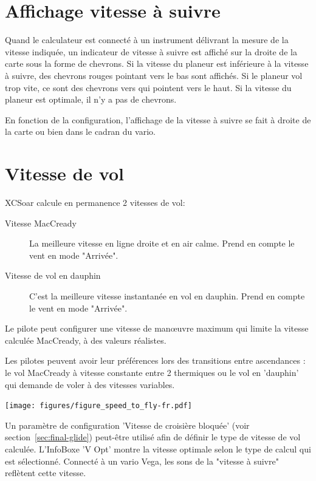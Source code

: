 \section{Affichage vitesse à suivre}

Quand le calculateur est connecté à un instrument délivrant la mesure de la vitesse indiquée, un indicateur de vitesse à suivre est affiché sur la droite de la carte sous la forme de chevrons. Si la vitesse du planeur est inférieure à la vitesse à suivre, des chevrons rouges pointant vers le bas sont affichés. Si le planeur vol trop vite, ce sont des chevrons vers qui pointent vers le haut. Si la vitesse du planeur est optimale, il n'y a pas de chevrons.

En fonction de la configuration, l'affichage de la vitesse à suivre se fait à droite de la carte ou bien dans le cadran du vario.

\section{Vitesse de vol}\label{sec:stf}

XCSoar calcule en permanence 2 vitesses de vol:
\begin{description}
\item[Vitesse MacCready]  La meilleure vitesse en ligne droite et en air calme. Prend en compte le vent en mode "Arrivée".
\item[Vitesse de vol en dauphin]  C'est la meilleure vitesse instantanée en vol en dauphin. Prend en compte le vent en mode "Arrivée".
\end{description}

Le pilote peut configurer une vitesse de manœuvre maximum qui limite la vitesse calculée MacCready, à des valeurs réalistes.

Les pilotes peuvent avoir leur préférences lors des transitions entre ascendances : le vol MacCready à vitesse constante entre 2 thermiques ou le vol en 'dauphin' qui demande de voler à des vitesses variables.

\begin{center}
\texttt{[image: figures/figure\_speed\_to\_fly-fr.pdf]}
\end{center}

Un paramètre de configuration 'Vitesse de croisière bloquée' (voir section~\ref{sec:final-glide}) peut-être utilisé afin de définir le type de vitesse de vol calculée. L'InfoBoxe 'V Opt' montre la vitesse optimale selon le type de calcul qui est sélectionné. Connecté à un vario Vega, les sons de la "vitesse à suivre"  reflètent cette vitesse.

